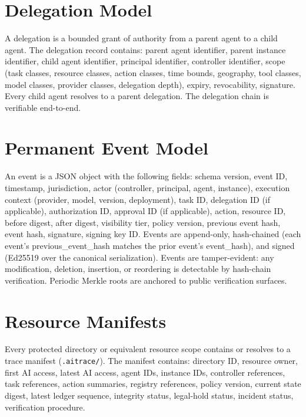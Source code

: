\documentclass[11pt,a4paper]{article}
\begin{document}
\section{Delegation Model}
\label{sec:delegation-model}

A delegation is a bounded grant of authority from a parent agent to a child agent. The delegation record contains: parent agent identifier, parent instance identifier, child agent identifier, principal identifier, controller identifier, scope (task classes, resource classes, action classes, time bounds, geography, tool classes, model classes, provider classes, delegation depth), expiry, revocability, signature. Every child agent resolves to a parent delegation. The delegation chain is verifiable end-to-end.

\section{Permanent Event Model}
\label{sec:event-model}

An event is a JSON object with the following fields: schema version, event ID, timestamp, jurisdiction, actor (controller, principal, agent, instance), execution context (provider, model, version, deployment), task ID, delegation ID (if applicable), authorization ID, approval ID (if applicable), action, resource ID, before digest, after digest, visibility tier, policy version, previous event hash, event hash, signature, signing key ID. Events are append-only, hash-chained (each event's previous\_event\_hash matches the prior event's event\_hash), and signed (Ed25519 over the canonical serialization). Events are tamper-evident: any modification, deletion, insertion, or reordering is detectable by hash-chain verification. Periodic Merkle roots are anchored to public verification surfaces.

\section{Resource Manifests}
\label{sec:resource-manifests}

Every protected directory or equivalent resource scope contains or resolves to a trace manifest (\texttt{.aitrace/}). The manifest contains: directory ID, resource owner, first AI access, latest AI access, agent IDs, instance IDs, controller references, task references, action summaries, registry references, policy version, current state digest, latest ledger sequence, integrity status, legal-hold status, incident status, verification procedure.
\end{document}
